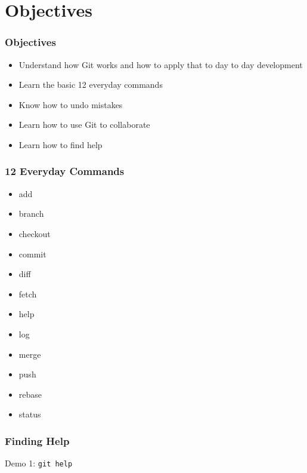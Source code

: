 \section[Section]{Objectives}

\begin{frame}
    \frametitle{Objectives}
    \begin{itemize}
        \item Understand how Git works and how to apply that to day to day
              development
        \item Learn the basic 12 everyday commands
        \item Know how to undo mistakes
        \item Learn how to use Git to collaborate
        \item Learn how to find help
    \end{itemize}
\end{frame}

\begin{frame}
    \frametitle{12 Everyday Commands}
    \begin{multicols}{3}
        \begin{itemize}
            \setlength\itemsep{3em}
            \item add
            \item branch
            \item checkout
            \item commit
            \item diff
            \item fetch
            \item help
            \item log
            \item merge
            \item push
            \item rebase
            \item status
        \end{itemize}
    \end{multicols}
\end{frame}

\begin{frame}
    \frametitle{Finding Help}
    \alert{Demo 1}: \texttt{git help}
\end{frame}

